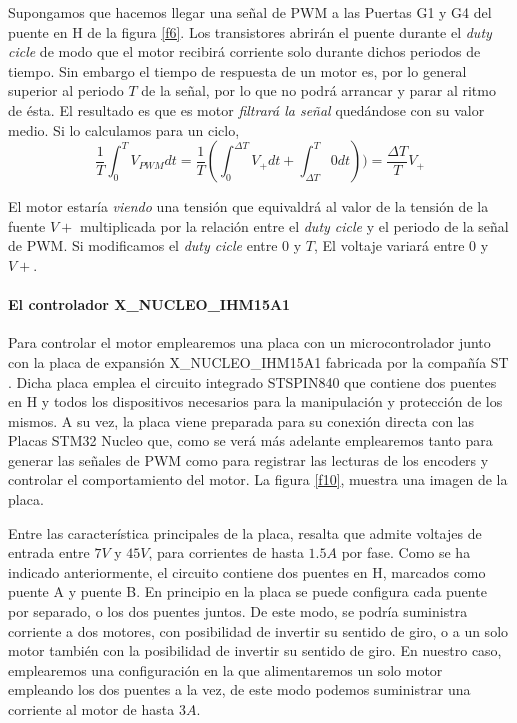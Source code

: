 \documentclass[10pt,a4paper]{report}
\begin{document}
Supongamos que hacemos llegar una señal de PWM a las Puertas G1 y G4 del puente en H de la figura \ref{f6}. Los transistores abrirán el puente durante el \emph{duty cicle} de modo que el motor recibirá corriente solo durante dichos periodos de tiempo. Sin embargo el tiempo de respuesta de un motor es, por lo general superior al periodo $T$ de la señal, por lo que no podrá arrancar y parar al ritmo de ésta. El resultado es que es motor \emph{filtrará la señal} quedándose con su valor medio. Si lo calculamos para un ciclo,
\begin{equation}
\frac{1}{T}\int^T_0 V_{PWM}dt = \frac{1}{T}\left(\int^{\Delta T}_0 V_{+}dt 
+ \int^{T}_{\Delta T} 0 dt\right)) = \frac{\Delta T}{T}V_{+}
\end{equation}

El motor estaría  \emph{viendo} una tensión que equivaldrá al valor de la tensión de la fuente $V+$ multiplicada por la relación entre el \emph{duty cicle} y el periodo de la señal de PWM. Si modificamos el \emph{duty cicle} entre $0$ y $T$, El voltaje variará entre $0$ y $V+$.

\paragraph{El controlador X\_NUCLEO\_IHM15A1} Para controlar el motor emplearemos una placa con un microcontrolador junto con  la placa de expansión X\_NUCLEO\_IHM15A1 fabricada por la compañía ST \cite{IHM15}. Dicha placa emplea el circuito integrado  STSPIN840  \cite{STSPIN840} que contiene dos puentes en H y todos los dispositivos necesarios para la manipulación y protección de los mismos. A su vez, la placa viene preparada para su conexión directa con las Placas STM32 Nucleo que, como se verá más adelante emplearemos tanto para generar las señales de PWM como para registrar las lecturas de los encoders y controlar el comportamiento del motor. La figura \ref{f10}, muestra una imagen de la placa. 

Entre las característica principales de la placa, resalta que admite voltajes de entrada entre $7V$ y $45V$, para corrientes de hasta $1.5 A$ por fase. Como se ha indicado anteriormente, el circuito contiene dos puentes en H, marcados como puente A y puente B.  En principio en la placa se puede configura  cada puente por separado, o los dos puentes juntos. De este modo, se podría suministra corriente a dos motores, con posibilidad de invertir su sentido de giro, o a un solo motor también con la posibilidad de invertir su sentido de giro. En nuestro caso, emplearemos  una configuración en la que alimentaremos un solo motor empleando los dos puentes a la vez, de este modo podemos suministrar una corriente al motor de hasta $3 A$.  
\end{document}
